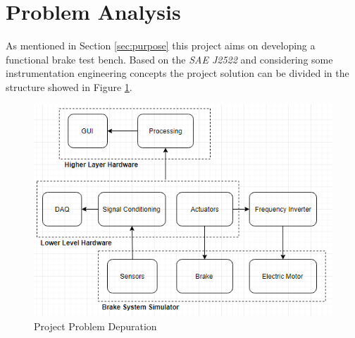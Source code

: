\section{Problem Analysis}

	As mentioned in Section \ref{sec:purpose} this project aims on developing a functional brake test bench. Based on the \textit{SAE J2522} \cite{sae} and considering some instrumentation engineering concepts the project solution can be divided in the structure showed in Figure \ref{fig:projectProblem}.
	
	\begin{figure}[htbp]
		\centering
			\includegraphics[scale=0.8]{figuras/fig-projectProblem}
		\caption{Project Problem Depuration \cite{projectProblem}}
		\label{fig:projectProblem}
	\end{figure}
	
	